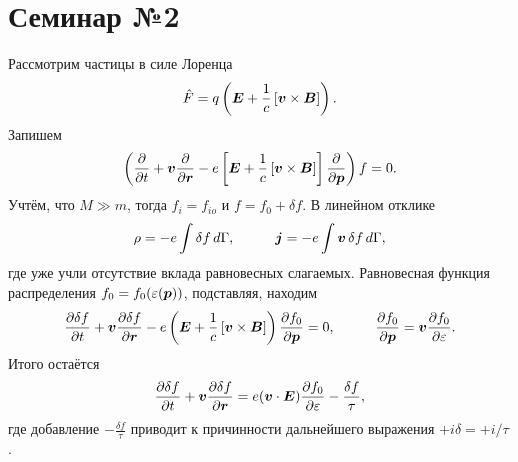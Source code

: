 \section*{Семинар №2}


Рассмотрим частицы в силе Лоренца
\begin{equation*}
	\hat{F} = q \left(
		\boldsymbol{E} + \frac{1}{c} \left[ \boldsymbol{v} \times  \boldsymbol{B} \right]
	\right).
\end{equation*}
Запишем
\begin{equation*}
	\left(
		\frac{\partial }{\partial t} + \boldsymbol{v} \frac{\partial }{\partial \boldsymbol{r}} - e \left[
			\boldsymbol{E} + \frac{1}{c} \left[\boldsymbol{v} \times  \boldsymbol{B}\right]
		\right] \frac{\partial }{\partial \boldsymbol{p}} 
	\right) f = 0.
\end{equation*}
Учтём, что $M \gg m$, тогда $f_i = f_{io}$  и $f = f_0 + \delta f$. В линейном отклике
\begin{equation*}
	\rho = - e \int \delta f \d \Gamma,
	\hspace{10 mm} 
	\vc{j} = - e \int \vc{v} \, \delta f  \d \Gamma,
\end{equation*}
где уже учли отсутствие вклада равновесных слагаемых. Равновесная функция распределения $f_0 = f_0 (\varepsilon(\boldsymbol{p}))$, подставляя, находим
\begin{equation*}
	\frac{\partial \delta f}{\partial t} + \vc{v} \frac{\partial \delta f}{\partial \vc{r}} - e\left(
		\vc{E} + \frac{1}{c}  \left[\vc{v} \times  \vc{B}\right]
	\right) \frac{\partial f_0}{\partial \vc{p}} = 0,
	\hspace{10 mm} 
	\frac{\partial f_0}{\partial \vc{p}} = \vc{v} \frac{\partial f_0}{\partial \varepsilon}.
\end{equation*}
Итого остаётся 
\begin{equation*}
	\frac{\partial \delta f}{\partial t}  + \boldsymbol{v} \frac{\partial \delta f}{\partial \boldsymbol{r}} = e (\boldsymbol{v} \cdot \boldsymbol{E}) \frac{\partial f_0}{\partial \varepsilon} - \frac{\delta f}{\tau},
\end{equation*}
где добавление $- \frac{\delta f}{\tau}$ приводит к причинности дальнейшего выражения $+ i \delta = + i / \tau$. 

